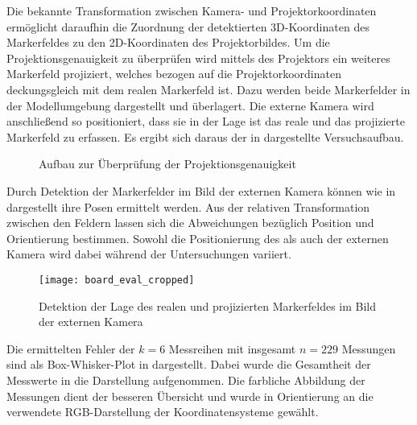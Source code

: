 Die bekannte Transformation zwischen Kamera- und Projektorkoordinaten ermöglicht daraufhin die Zuordnung der detektierten 3D-Koordinaten des Markerfeldes zu den 2D-Koordinaten des Projektorbildes. Um die Projektionsgenauigkeit zu überprüfen wird mittels des Projektors ein weiteres Markerfeld projiziert, welches bezogen auf die Projektorkoordinaten deckungsgleich mit dem realen Markerfeld ist. Dazu werden beide Markerfelder in der Modellumgebung dargestellt und überlagert. Die externe Kamera wird anschließend so positioniert, dass sie in der Lage ist das reale und das projizierte Markerfeld zu erfassen. Es ergibt sich daraus der in  dargestellte Versuchsaufbau.\\

\begin{figure}[!ht]
	\begin{center}%
		\caption{Aufbau zur Überprüfung der Projektionsgenauigkeit}
		\label{fig.projsetup}
	\end{center}
\end{figure}

Durch Detektion der Markerfelder im Bild der externen Kamera können wie in  dargestellt ihre Posen ermittelt werden. Aus der relativen Transformation zwischen den Feldern lassen sich die Abweichungen bezüglich Position und Orientierung bestimmen. Sowohl die Positionierung des  als auch der externen Kamera wird dabei während der Untersuchungen variiert.\\


\begin{figure}[!ht]
	\begin{center}
		\texttt{[image: board\_eval\_cropped]}
		\caption{Detektion der Lage des realen und projizierten Markerfeldes im Bild der externen Kamera}
		\label{fig.arprojected}
	\end{center}
\end{figure}%

Die ermittelten Fehler der $k=6$ Messreihen mit insgesamt $n=229$ Messungen sind als Box-Whisker-Plot in  dargestellt. Dabei wurde die Gesamtheit der Messwerte in die Darstellung aufgenommen. Die farbliche Abbildung der Messungen dient der besseren Übersicht und wurde in Orientierung an die verwendete RGB-Darstellung der Koordinatensysteme gewählt.\\


